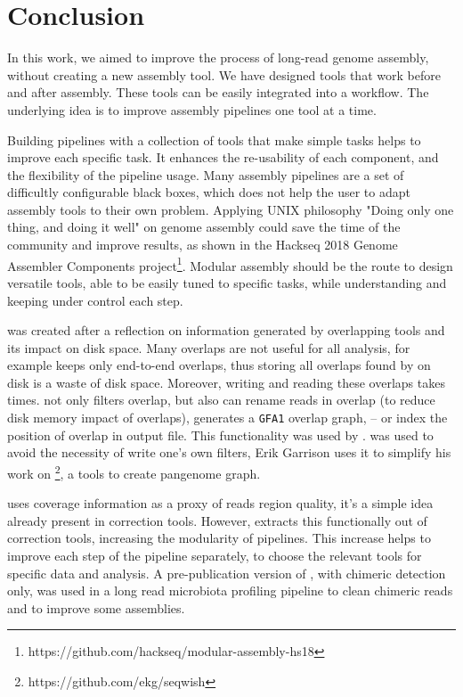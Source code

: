 \documentclass[main.tex]{subfiles}
\begin{document}
\chapter{Conclusion}

In this work, we aimed to improve the process of long-read genome assembly, without creating a new assembly tool. We have designed tools that work before and after assembly. These tools can be easily integrated into a workflow. The underlying idea is to improve assembly pipelines one tool at a time.

Building pipelines with a collection of tools that make simple tasks helps to improve each specific task. It enhances the re-usability of each component, and the flexibility of the pipeline usage. Many assembly pipelines are a set of difficultly configurable black boxes, which does not help the user to adapt assembly tools to their own problem. Applying UNIX philosophy "Doing only one thing, and doing it well" on genome assembly could save the time of the community and improve results, as shown in the Hackseq 2018 Genome Assembler Components project\footnote{https://github.com/hackseq/modular-assembly-hs18}. Modular assembly should be the route to design versatile tools, able to be easily tuned to specific tasks, while understanding and keeping under control each step.

\fpa was created after a reflection on information generated by overlapping tools and its impact on disk space. Many overlaps are not useful for all analysis, for example \miniasm keeps only end-to-end overlaps, thus storing all overlaps found by \minimap on disk is a waste of disk space. Moreover, writing and reading these overlaps takes times. \fpa not only filters overlap, but also can rename reads in overlap (to reduce disk memory impact of overlaps), generates a \texttt{GFA1} overlap graph, -- or index the position of overlap in output file. This functionality was used by \consent \cite{CONSENT}. \fpa was used to avoid the necessity of write one's own filters, Erik Garrison uses it to simplify his work on \footnote{https://github.com/ekg/seqwish}, a tools to create pangenome graph.

\yacrd uses coverage information as a proxy of reads region quality, it's a simple idea already present in correction tools. However, \yacrd extracts this functionally out of correction tools, increasing the modularity of pipelines. This increase helps to improve each step of the pipeline separately, to choose the relevant tools for specific data and analysis. A pre-publication version of \yacrd, with chimeric detection only, was used in a long read microbiota profiling pipeline to clean chimeric reads \cite{cite_yacrd} and to improve some \flye assemblies. 
\end{document}
